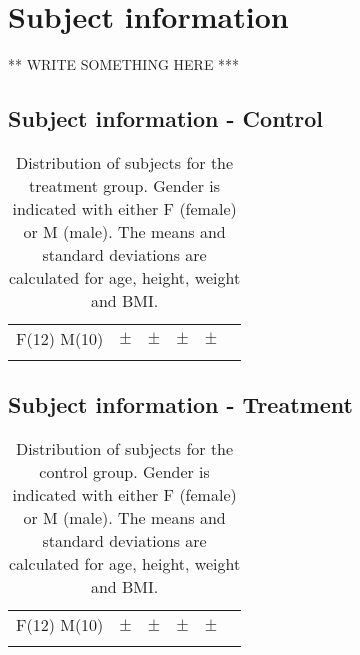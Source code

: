 \section{Subject information}

** WRITE SOMETHING HERE ***

\subsection{Subject information - Control}
\begin{longtable}{l|c|c|c|c|c}
	\rowcolor[HTML]{C0C0C0} \rule{0pt}{3ex}  \color[HTML]{000000}{Gender} & \color[HTML]{000000}{Age} & \color[HTML]{000000}{Weight} & \color[HTML]{000000}{Height} &  \color[HTML]{000000}{BMI} 
	\\ \hline \rule{0pt}{3ex} 
	F(12) M(10) & $\pm$ & $\pm$  &  $\pm$ &  $\pm$ 
	\\ \hline 
	\caption{Distribution of subjects for the treatment group. Gender is indicated with either F (female) or M (male). The means and standard deviations are calculated for age, height, weight and BMI.}
	\label{tab:subjects}
\end{longtable}
\vspace{-.5cm}


\subsection{Subject information - Treatment}
\begin{longtable}{l|c|c|c|c|c}
	\rowcolor[HTML]{C0C0C0} \rule{0pt}{3ex}  \color[HTML]{000000}{Gender} & \color[HTML]{000000}{Age} & \color[HTML]{000000}{Weight} & \color[HTML]{000000}{Height} &  \color[HTML]{000000}{BMI} 
	\\ \hline \rule{0pt}{3ex} 
	F(12) M(10) & $\pm$ & $\pm$  &  $\pm$ &  $\pm$ 
	\\ \hline 
	\caption{Distribution of subjects for the control group. Gender is indicated with either F (female) or M (male). The means and standard deviations are calculated for age, height, weight and BMI.}
	\label{tab:subjects}
\end{longtable}
\vspace{-.5cm}